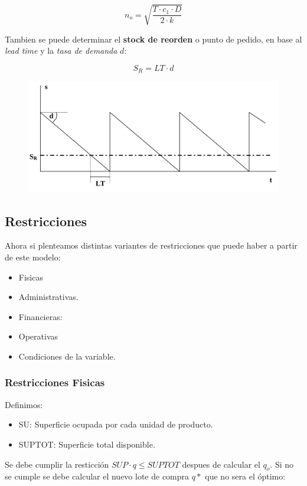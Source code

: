 \documentclass{article}
\begin{document}
\begin{equation}
    n_o = \sqrt{\frac{T \cdot c_1 \cdot D}{2 \cdot k}}
\end{equation}

Tambien se puede determinar el \textbf{stock de reorden} o punto de pedido, en base al \textit{lead time} y la \textit{tasa de demanda} \(d\):

\begin{equation}
    S_R = LT \cdot d
\end{equation}

\begin{figure}[h!]
    \includegraphics[width=\linewidth]{imagenes/stock-reorden.png}
\end{figure}


\newpage
\subsection{Restricciones}

Ahora si plenteamos distintas variantes de restricciones que puede haber a partir de este modelo:

\begin{itemize}
    \item Fisicas
    \item Administrativas.
    \item Financieras:
    \item Operativas
    \item Condiciones de la variable.
\end{itemize}

\subsubsection{Restricciones Fisicas}

Definimos:
\begin{itemize}
    \item SU: Superficie ocupada por cada unidad de producto.
    \item SUPTOT: Superficie total disponible.
\end{itemize}
Se debe cumplir la resticción \(SUP \cdot q \leq SUPTOT\) despues de calcular el \(q_o\). 
Si no se cumple se debe calcular el nuevo lote de compra \(q*\) que no sera el óptimo:
\end{document}
